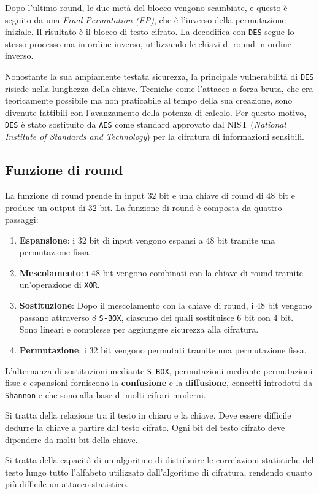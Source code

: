 Dopo l'ultimo round, le due metà del blocco vengono scambiate, e questo è seguito da una
\textit{Final Permutation (FP)}, che è l'inverso della permutazione iniziale. Il risultato
è il blocco di testo cifrato. La decodifica con \texttt{DES} segue lo stesso processo ma
in ordine inverso, utilizzando le chiavi di round in ordine inverso.

Nonostante la sua ampiamente testata sicurezza, la principale vulnerabilità di \texttt{DES}
risiede nella lunghezza della chiave. Tecniche come l'attacco a forza bruta, che era
teoricamente possibile ma non praticabile al tempo della sua creazione, sono divenute
fattibili con l'avanzamento della potenza di calcolo. Per questo motivo, \texttt{DES}
è stato sostituito da \texttt{AES} come standard approvato dal NIST (\textit{National
Institute of Standards and Technology}) per la cifratura di informazioni sensibili.
\subsection{Funzione di round}
La funzione di round prende in input $32$ bit e una chiave di round di $48$ bit e produce
un output di $32$ bit. La funzione di round è composta da quattro passaggi:
\begin{enumerate}
    \item \textbf{Espansione}: i $32$ bit di input vengono espansi a $48$ bit tramite una
    permutazione fissa.
    \item \textbf{Mescolamento}: i $48$ bit vengono combinati con la chiave di round tramite
    un'operazione di \texttt{XOR}.
    \item \textbf{Sostituzione}: Dopo il mescolamento con la chiave di round, i $48$ bit vengono
    passano attraverso $8$ \texttt{S-BOX}, ciascuno dei quali sostituisce $6$ bit con $4$ bit. 
    Sono lineari e complesse per aggiungere sicurezza alla cifratura.
    \item \textbf{Permutazione}: i $32$ bit vengono permutati tramite una permutazione fissa.
\end{enumerate}
L'alternanza di sostituzioni mediante \texttt{S-BOX}, permutazioni mediante permutazioni fisse
e espansioni forniscono la \textbf{confusione} e la \textbf{diffusione}, concetti introdotti
da \texttt{Shannon} e che sono alla base di molti cifrari moderni.

\begin{tcolorbox}[title=Confusione]
    Si tratta della relazione tra il testo in chiaro e la chiave. Deve essere difficile
    dedurre la chiave a partire dal testo cifrato. Ogni bit del testo cifrato deve
    dipendere da molti bit della chiave.
\end{tcolorbox}

\begin{tcolorbox}[title=Diffusione]
    Si tratta della capacità di un algoritmo di distribuire le correlazioni statistiche
    del testo lungo tutto l'alfabeto utilizzato dall'algoritmo di cifratura, rendendo quanto 
    più difficile un attacco statistico.
\end{tcolorbox}